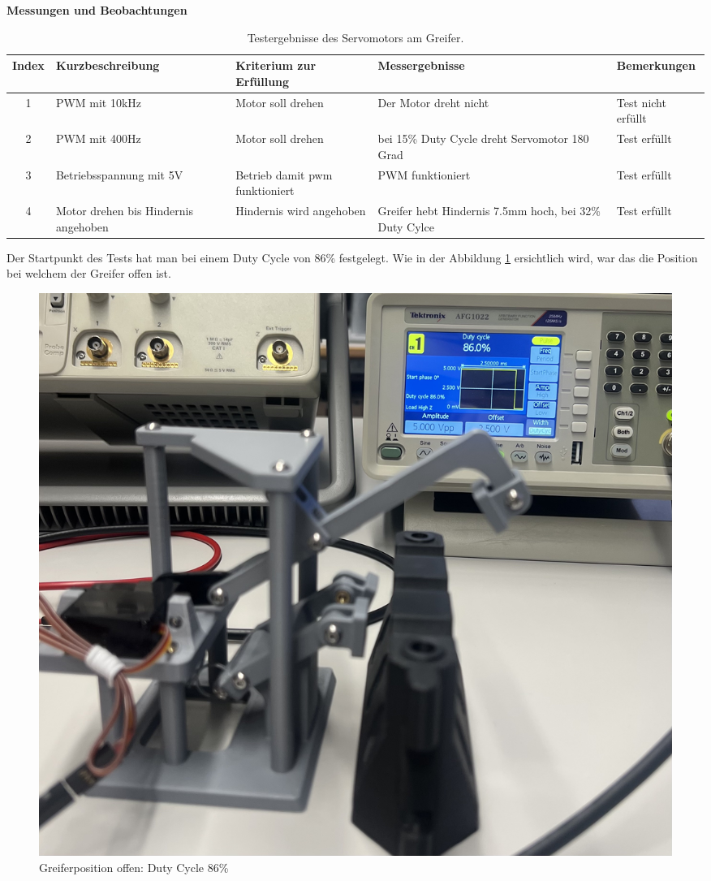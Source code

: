 \textbf{Messungen und Beobachtungen}

\begin{table}[H]
\centering
\small
\begin{tabularx}{\textwidth}{|c|X|X|X|l|}
        \hline
        \textbf{Index} & \textbf{Kurzbeschreibung} & \textbf{Kriterium zur Erfüllung} & \textbf{Messergebnisse} & \textbf{Bemerkungen} \\
        \hline
        1 & PWM mit 10kHz & Motor soll drehen & Der Motor dreht nicht & Test nicht erfüllt \\ \hline
        2 & PWM mit 400Hz & Motor soll drehen & bei 15\% Duty Cycle dreht Servomotor 180 Grad & Test erfüllt \\ \hline
        3 & Betriebsspannung mit 5V & Betrieb damit \acrshort{pwm} funktioniert  & PWM funktioniert & Test erfüllt\\ \hline
        4 & Motor drehen bis Hindernis angehoben & Hindernis wird angehoben & Greifer hebt Hindernis 7.5mm hoch, bei 32\% Duty Cylce & Test erfüllt \\ \hline
\end{tabularx}
    \caption{Testergebnisse des Servomotors am Greifer.}
\label{tab:testpunkte Servomotor}
\end{table}

\newpage

Der Startpunkt des Tests hat man bei einem Duty Cycle von 86\% festgelegt. Wie in der Abbildung \ref{fig: Greiferposition offen: Duty Cycle 86} ersichtlich wird, war das die Position bei welchem der Greifer offen ist.

\begin{figure}[H]
    \centering
    \includegraphics[width=0.8\linewidth]{img/ServoGreifferoffen.jpeg}
    \caption{Greiferposition offen: Duty Cycle 86\%}
    \label{fig: Greiferposition offen: Duty Cycle 86}
\end{figure}

